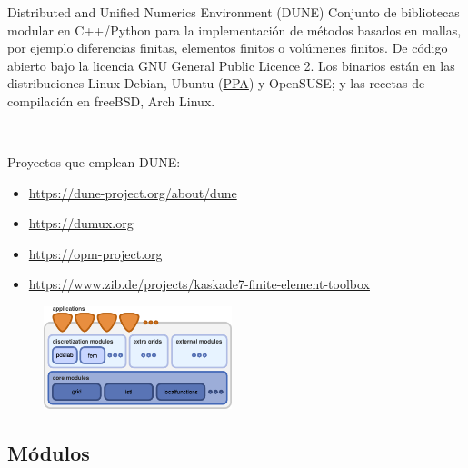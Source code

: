 \begin{frame}
	\frametitle{\secname}
	\framesubtitle{\subsecname}

	\begin{alertblock}{Distributed and Unified Numerics Environment (DUNE)}
		Conjunto de bibliotecas modular en C++/Python para la implementación de métodos basados en mallas, por ejemplo diferencias finitas, elementos finitos o volúmenes finitos.
		De código abierto bajo la licencia GNU General Public Licence 2.
		Los binarios están en las distribuciones Linux Debian, Ubuntu (\href{https://launchpad.net/~opm/+archive/ubuntu/ppa}{PPA}) y OpenSUSE; y las recetas de compilación en freeBSD, Arch Linux.

		\

		Proyectos que emplean DUNE:
		\begin{itemize}
			\item \url{https://dune-project.org/about/dune}
			\item \url{https://dumux.org}
			\item \url{https://opm-project.org}
			\item \url{https://www.zib.de/projects/kaskade7-finite-element-toolbox}
		\end{itemize}
	\end{alertblock}

	\begin{figure}[ht!]
		\centering
		\includegraphics[height=3cm]{dunedesign}
	\end{figure}

\end{frame}

\subsection{Módulos}

